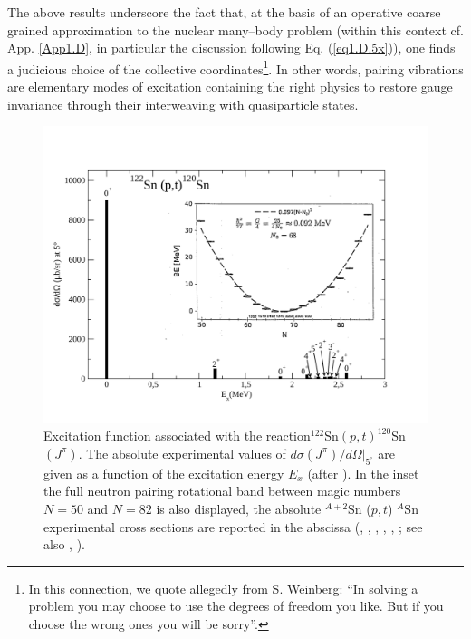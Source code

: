 The above results underscore the fact that, at the basis of an operative coarse grained approximation to the nuclear many--body problem (within this context cf. App. \ref{App1.D}, in particular the discussion following Eq. (\ref{eq1.D.5x})), one finds a judicious choice of the collective coordinates\footnote{In this connection, we quote allegedly from S. Weinberg: ``In solving a problem you may choose to use the degrees of freedom you like. But if you choose the wrong ones you will be sorry''.}. In other words, pairing vibrations are elementary modes of excitation containing the right physics to restore gauge invariance through their interweaving with  quasiparticle states.
  \begin{figure}
  \centerline{\includegraphics*[width=\textwidth,angle=0]{nutshell/figs/ExcitedSn122pt.pdf}}
  \caption{Excitation function associated with the reaction$^{122}$Sn$(p,t)^{120}$Sn$(J^\pi)$. The absolute experimental values of $d\sigma(J^\pi)/d\Omega|_{5^\circ}$ are given as a function of the excitation energy $E_x$ (after \cite{Guazzoni:11}). In the inset the full neutron pairing rotational band between magic numbers $N=50$ and $N=82$ is also displayed, the absolute $^{A+2}$Sn ($p,t$) $^{A}$Sn experimental cross sections are reported in the abscissa (\cite{Guazzoni:99}, \cite{Guazzoni:04}, \cite{Guazzoni:06}, \cite{Guazzoni:08}, \cite{Guazzoni:11}, \cite{Guazzoni:12}; see also \cite{Potel:11}, \cite{Potel:13b}).}\label{fig1.3}
  \end{figure}
